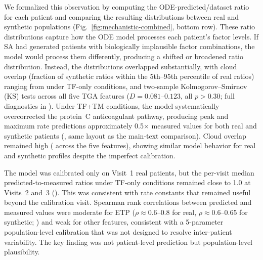 We formalized this observation by computing the ODE-predicted/dataset ratio for each
patient and comparing the resulting distributions between real and synthetic
populations (Fig.~\ref{fig:mechanistic-combined}, bottom row). These ratio
distributions capture how the ODE model processes each patient's factor levels. If
SA had generated patients with biologically implausible factor combinations, the
model would process them differently, producing a shifted or broadened ratio
distribution. Instead, the distributions overlapped substantially, with cloud
overlap (fraction of synthetic ratios within the 5th--95th percentile of real
ratios) ranging from  under TF-only conditions,
and two-sample Kolmogorov--Smirnov (KS) tests  across all five TGA features
($D = 0.081$--$0.123$, all $p > 0.30$; full diagnostics in
).
Under TF+TM conditions, the model systematically overcorrected the protein~C
anticoagulant pathway, producing peak and maximum rate predictions
approximately 0.5$\times$ measured values for both real and synthetic patients
(, same layout as the main-text
comparison). Cloud overlap remained high ( across the
five features), showing similar model behavior for real and synthetic profiles despite the
imperfect calibration.

The model was calibrated only on Visit~1 real patients, but the per-visit median predicted-to-measured
ratios under TF-only conditions remained close to 1.0 at Visits~2 and~3
(). This was consistent with rate constants that remained useful
beyond the calibration visit. Spearman rank correlations between predicted and measured values were
moderate for ETP ($\rho \approx 0.6$--$0.8$ for real, $\rho \approx 0.6$--$0.65$
for synthetic; ) and weak for other features, consistent with
a 5-parameter population-level calibration that was not designed to resolve
inter-patient variability. The key finding was not patient-level prediction but
population-level plausibility. 

